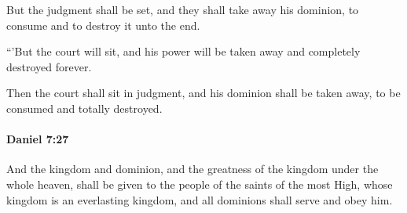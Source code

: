 			\begin{versebox}
					\item[BHS] 
					\item[LXX] 
					\item[ASV] But the judgment shall be set, and they shall take away his dominion, to consume and to destroy it unto the end.
					\item[NIV] “’But the court will sit, and his power will be taken away and completely destroyed forever.
					\item[NRSV] Then the court shall sit in judgment, and his dominion shall be taken away, to be consumed and totally destroyed.
			\end{versebox}

		\paragraph{Daniel 7:27} %
			\label{DANIEL-7-27}

			And the kingdom and dominion, and the greatness of the kingdom under the whole heaven, shall be given to the people of the saints of the most High, whose kingdom is an everlasting kingdom, and all dominions shall serve and obey him.

